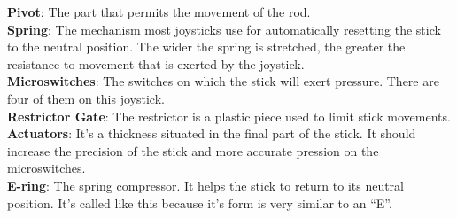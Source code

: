 \textbf{Pivot}: The part that permits the movement of the rod.\\
\textbf{Spring}: The mechanism most joysticks use for automatically resetting the stick to the neutral position. The wider the spring is stretched, the greater the resistance to movement that is exerted by the joystick.\\
\textbf{Microswitches}: The switches on which the stick will exert pressure. There are four of them on this joystick.\\
\textbf{Restrictor Gate}: The restrictor is a plastic piece used to limit stick movements.\\
\textbf{Actuators}: It’s a thickness situated in the final part of the stick. It should increase the precision  of the stick and more accurate pression on the microswitches.\\
\textbf{E-ring}: The spring compressor. It helps the stick to return to its neutral position. It’s called like this because it’s form is very similar to an “E”.\\
\newpage

